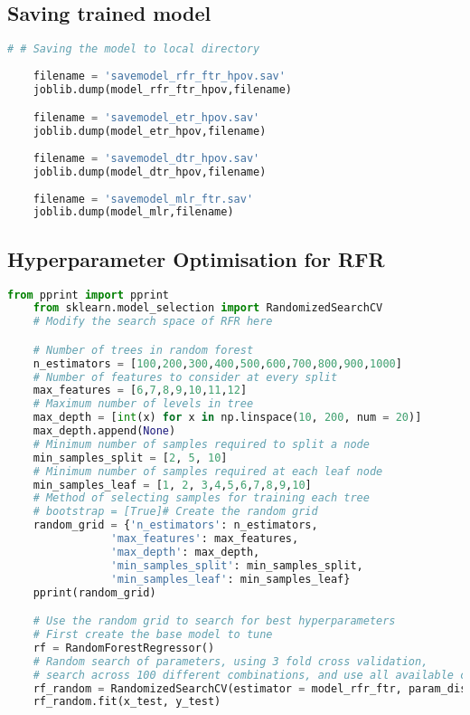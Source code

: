 \subsection*{Saving trained model}

\begin{lstlisting}[language=Python]
    # # Saving the model to local directory
  
    filename = 'savemodel_rfr_ftr_hpov.sav'
    joblib.dump(model_rfr_ftr_hpov,filename)

    filename = 'savemodel_etr_hpov.sav'
    joblib.dump(model_etr_hpov,filename)
    
    filename = 'savemodel_dtr_hpov.sav'
    joblib.dump(model_dtr_hpov,filename)
    
    filename = 'savemodel_mlr_ftr.sav'
    joblib.dump(model_mlr,filename)

\end{lstlisting}

\subsection*{Hyperparameter Optimisation for RFR}

\begin{lstlisting}[language=Python]
    from pprint import pprint
    from sklearn.model_selection import RandomizedSearchCV
    # Modify the search space of RFR here

    # Number of trees in random forest
    n_estimators = [100,200,300,400,500,600,700,800,900,1000]
    # Number of features to consider at every split
    max_features = [6,7,8,9,10,11,12]
    # Maximum number of levels in tree
    max_depth = [int(x) for x in np.linspace(10, 200, num = 20)]
    max_depth.append(None)
    # Minimum number of samples required to split a node
    min_samples_split = [2, 5, 10]
    # Minimum number of samples required at each leaf node
    min_samples_leaf = [1, 2, 3,4,5,6,7,8,9,10]
    # Method of selecting samples for training each tree
    # bootstrap = [True]# Create the random grid
    random_grid = {'n_estimators': n_estimators,
                'max_features': max_features,
                'max_depth': max_depth,
                'min_samples_split': min_samples_split,
                'min_samples_leaf': min_samples_leaf}
    pprint(random_grid)

    # Use the random grid to search for best hyperparameters
    # First create the base model to tune
    rf = RandomForestRegressor()
    # Random search of parameters, using 3 fold cross validation, 
    # search across 100 different combinations, and use all available cores
    rf_random = RandomizedSearchCV(estimator = model_rfr_ftr, param_distributions = random_grid, n_iter = 100, cv = 5, verbose=2, random_state=42,n_jobs=-1)# Fit the random search model
    rf_random.fit(x_test, y_test)
\end{lstlisting}

